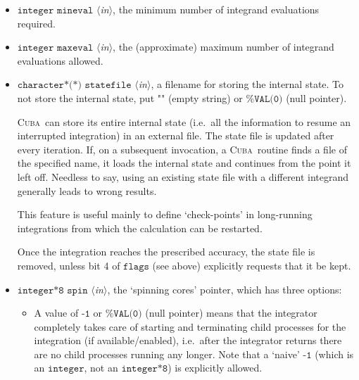 \documentclass[12pt]{article}
\newcommand\cuba{\textsc{Cuba}}
\newcommand\ie{i.e.\ }
\newcommand\Code[1]{\ensuremath{\texttt{#1}}}
\newcommand\VarIn[1]{\item\Code{#1} \textit{$\langle$in\/$\rangle$},}
\begin{document}
\begin{itemize}
Ranlux implements Marsaglia and Zaman's 24-bit RCARRY algorithm with
generation period $p$, \ie for every 24 generated numbers used, another
$p - 24$ are skipped.  The luxury level is encoded in \Code{level} as
follows:
\begin{itemize}
\item Level 1 ($p = 48$):
	very long period, passes the gap test but fails spectral test.
\item Level 2 ($p = 97$):
	passes all known tests, but theoretically still defective.
\item Level 3 ($p = 223$):
	any theoretically possible correlations have very small 
	chance of being observed.
\item Level 4 ($p = 389$):
	highest possible luxury, all 24 bits chaotic.
\end{itemize}
Levels 5--23 default to 3, values above 24 directly specify the period
$p$.  Note that Ranlux's original level 0, (mis)used for selecting
Mersenne Twister in \cuba, is equivalent to \Code{level = 24}.

\VarIn{integer mineval}
the minimum number of integrand evaluations required.

\VarIn{integer maxeval}
the (approximate) maximum number of integrand evaluations allowed.

\VarIn{character*(*) statefile}
a filename for storing the internal state.  To not store the internal 
state, put \Code{""} (empty string) or \Code{\%VAL(0)} (null pointer).

\cuba\ can store its entire internal state (\ie all the information to 
resume an interrupted integration) in an external file.  The state file 
is updated after every iteration.  If, on a subsequent invocation, a
\cuba\ routine finds a file of the specified name, it loads the internal
state and continues from the point it left off.  Needless to say, using
an existing state file with a different integrand generally leads to
wrong results.

This feature is useful mainly to define `check-points' in long-running 
integrations from which the calculation can be restarted.

Once the integration reaches the prescribed accuracy, the state file
is removed, unless bit 4 of \Code{flags} (see above) explicitly requests 
that it be kept.

\VarIn{integer*8 spin}
the `spinning cores' pointer, which has three options:
\begin{itemize}
\item A value of \Code{-1} or \Code{\%VAL(0)} (null pointer) means that 
the integrator completely takes care of starting and terminating child 
processes for the integration (if available/enabled), \ie after the 
integrator returns there are no child processes running any longer.  
Note that a `naive' \Code{-1} (which is an \Code{integer}, not an 
\Code{integer*8}) is explicitly allowed.


\end{itemize}
\end{itemize}
\end{document}
